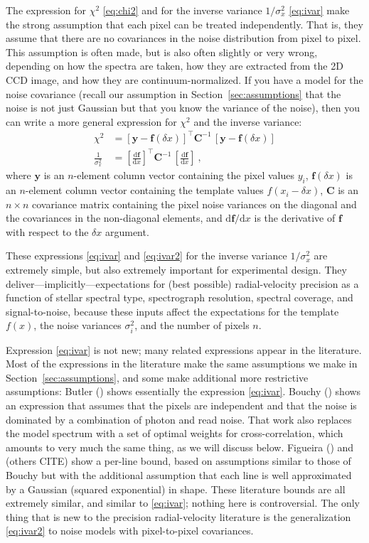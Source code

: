 \documentclass[modern]{aastex631}
\newcommand{\dd}{\mathrm{d}}
\newcommand{\lao}[1]{\boldsymbol{#1}}
\newcommand{\vy}{\lao{y}}
\newcommand{\vf}{\lao{f}}
\newcommand{\vC}{\lao{C}}
\newcommand{\sectionname}{Section}
\newcommand{\secref}[1]{\sectionname~\ref{#1}}
\begin{document}
The expression for $\chi^2$ \eqref{eq:chi2} and for the inverse variance $1/\sigma_x^2$ \eqref{eq:ivar} make the strong assumption that each pixel can be treated independently.
That is, they assume that there are no covariances in the noise distribution from pixel to pixel.
This assumption is often made, but is also often slightly or very wrong, depending on how the spectra are taken, how they are extracted from the 2D CCD image, and how they are continuum-normalized.
If you have a model for the noise covariance (recall our assumption in \secref{sec:assumptions} that the noise is not just Gaussian but that you know the variance of the noise), then you can write a more general expression for $\chi^2$ and the inverse variance:
\begin{align}
    \chi^2 &= [\vy - \vf(\delta x)]^\top\vC^{-1}\,[\vy - \vf(\delta x)]\\
    \frac{1}{\sigma_x^2} &= \left[\frac{\dd\vf}{\dd x}\right]^\top\vC^{-1}\,\left[\frac{\dd\vf}{\dd x}\right]\label{eq:ivar2} ~,
\end{align}
where $\vy$ is an $n$-element column vector containing the pixel values $y_i$,
$\vf(\delta x)$ is an $n$-element column vector containing the template values $f(x_i-\delta x)$,
$\vC$ is an $n\times n$ covariance matrix containing the pixel noise variances on the diagonal and the covariances in the non-diagonal elements,
and $\dd\vf/\dd x$ is the derivative of $\vf$ with respect to the $\delta x$ argument.

These expressions \eqref{eq:ivar} and \eqref{eq:ivar2} for the inverse variance $1/\sigma_x^2$ are extremely simple, but also extremely important for experimental design.
They deliver---implicitly---expectations for (best possible) radial-velocity precision as a function of stellar spectral type, spectrograph resolution, spectral coverage, and signal-to-noise, because these inputs affect the expectations for the template $f(x)$, the noise variances $\sigma_i^2$, and the number of pixels $n$.

Expression \eqref{eq:ivar} is not new; many related expressions appear in the literature.
Most of the expressions in the literature make the same assumptions we make in \secref{sec:assumptions}, and some make additional more restrictive assumptions:
Butler (\citealt{Butler}) shows essentially the expression \eqref{eq:ivar}.
Bouchy (\citealt{Bouchy}) shows an expression that assumes that the pixels are independent and that the noise is dominated by a combination of photon and read noise. 
That work also replaces the model spectrum with a set of optimal weights for cross-correlation, which amounts to very much the same thing, as we will discuss below.
Figueira (\citealt{figuera}) and (others CITE) show a per-line bound, based on assumptions similar to those of Bouchy but with the additional assumption that each line is well approximated by a Gaussian (squared exponential) in shape.
These literature bounds are all extremely similar, and similar to \eqref{eq:ivar}; nothing here is controversial.
The only thing that is new to the precision radial-velocity literature is the generalization \eqref{eq:ivar2} to noise models with pixel-to-pixel covariances.
\end{document}
